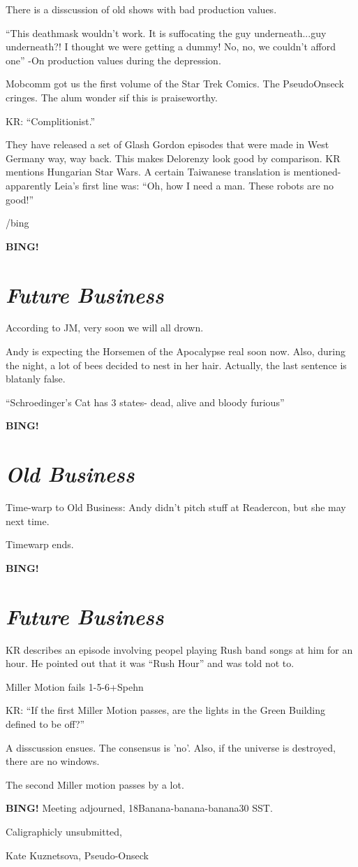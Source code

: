 \documentclass[10pt]{article}
\newcommand{\bing}{{\bf BING!} }
\newcommand{\goto}[1]{\bing \vskip 12pt \section*{{\em{#1}}}}
\begin{document}
There is a disscussion of old shows with bad production values. 

``This deathmask wouldn't work. It is suffocating the guy underneath...guy underneath?! I thought we were getting a dummy! No, no, we couldn't afford one''
-On production values during the depression.

Mobcomm got us the first volume of the Star Trek Comics. The PseudoOnseck cringes. The alum wonder sif this is praiseworthy.

KR: ``Complitionist.'' 

They have released a set of Glash Gordon episodes that were made in West Germany way, way back. This makes Delorenzy look good by comparison.  KR mentions Hungarian Star Wars.  A certain Taiwanese translation is mentioned- apparently Leia's first line was:
``Oh, how I need a man. These robots are no good!''

/bing

\goto{Future Business}

According to JM, very soon we will all drown.

Andy is expecting the Horsemen of the Apocalypse real soon now. Also, during the night, a lot of bees decided to nest in her hair. Actually, the last sentence is blatanly false.

``Schroedinger's Cat has 3 states- dead, alive and bloody furious''


\goto{Old Business}
Time-warp to Old Business: Andy didn't pitch stuff at Readercon, but she may next time.

Timewarp ends.

\goto{Future Business}

KR describes an episode involving peopel playing Rush band songs at him for an hour. He pointed out that it was ``Rush Hour'' and was told not to.

Miller Motion fails 1-5-6+Spehn

KR:  ``If the first Miller Motion passes, are the lights in the Green Building defined to be off?''

A disscussion ensues. The consensus is 'no'. Also, if the universe is destroyed, there are no windows.

The second Miller motion passes by a lot.

\bing
\noindent
Meeting adjourned,  18Banana-banana-banana30 SST.

\vspace{18pt}

\centerline{Caligraphicly unsubmitted,}
\centerline{Kate Kuznetsova, Pseudo-Onseck}
\end{document}
